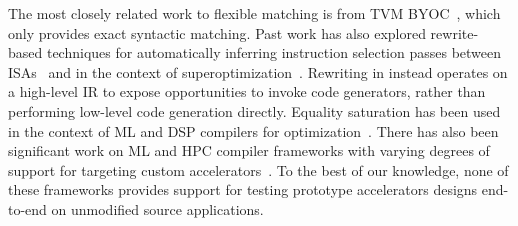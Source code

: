 The most closely related work to flexible matching is from 
   TVM BYOC~\cite{chen2021byoc}, which only provides exact syntactic matching.
Past work has also explored rewrite-based techniques for
  automatically inferring instruction selection passes
  between ISAs~\cite{
    ramsey2011resourceable,
    dias2010automatically}
  and in the context of superoptimization~\cite{
    bonsal-so,
    bonsal-so-translate}.
Rewriting in \TLA instead operates on a high-level IR
  to expose opportunities to invoke code generators,
  rather than performing low-level code generation directly.
Equality saturation has been
  used in the context of
  ML and DSP compilers for
  optimization~\cite{
    yang2021equality,
    alexa-dsp-eqsat,
    caviar-cc22}.
There has also been significant work on
  ML and HPC compiler frameworks with
  varying degrees of support for
  targeting custom accelerators~\cite{
    ragan2013halide,
    AtlPopl22,
    chen2018tvm,
    moreau2019hardware,
    lattner2021mlir}.
To the best of our knowledge,
  none of these frameworks provides support for
  testing prototype accelerators
  designs end-to-end on
  unmodified source applications.
  



